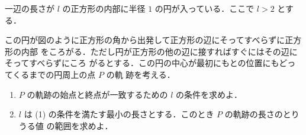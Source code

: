 一辺の長さが $l$ の正方形の内部に半径 $1$ の円が入っている．ここで $l > 2$ とする．

この円が図のように正方形の角から出発して正方形の辺にそってすべらずに正方形の内部
をころがる．ただし円が正方形の他の辺に接すればすぐにはその辺にそってすべらずにころ
がるとする．この円の中心が最初にもとの位置にもどってくるまでの円周上の点 $P$ の軌
跡を考える．

\begin{enumerate}
  \item[(1)] $P$ の軌跡の始点と終点が一致するための $l$ の条件を求めよ．
  \item[(2)] $l$ は (1) の条件を満たす最小の長さとする．このとき $P$ の軌跡の長さのとりうる値
        の範囲を求めよ．
\end{enumerate}

\begin{figure}[H]
  \centering
\end{figure}